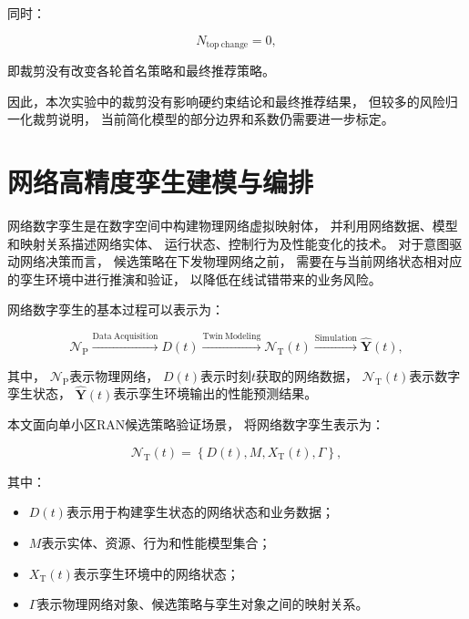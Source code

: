 \documentclass[lang=cn,12pt]{elegantbook}
\begin{document}
同时：

\begin{equation}
N_{\mathrm{top\ change}}=0,
\label{eq:clipping_top_change_reduced}
\end{equation}

即裁剪没有改变各轮首名策略和最终推荐策略。

因此，本次实验中的裁剪没有影响硬约束结论和最终推荐结果，
但较多的风险归一化裁剪说明，
当前简化模型的部分边界和系数仍需要进一步标定。

\chapter{网络高精度孪生建模与编排}
\label{sec:high_fidelity_twin_overview}

网络数字孪生是在数字空间中构建物理网络虚拟映射体，
并利用网络数据、模型和映射关系描述网络实体、
运行状态、控制行为及性能变化的技术。
对于意图驱动网络决策而言，
候选策略在下发物理网络之前，
需要在与当前网络状态相对应的孪生环境中进行推演和验证，
以降低在线试错带来的业务风险。

网络数字孪生的基本过程可以表示为：

\begin{equation}
\mathcal{N}_{\mathrm{P}}
\xrightarrow{\mathrm{Data\ Acquisition}}
D(t)
\xrightarrow{\mathrm{Twin\ Modeling}}
\mathcal{N}_{\mathrm{T}}(t)
\xrightarrow{\mathrm{Simulation}}
\hat{\boldsymbol{Y}}(t),
\label{eq:physical_to_twin_overview}
\end{equation}

其中，
$\mathcal{N}_{\mathrm{P}}$表示物理网络，
$D(t)$表示时刻$t$获取的网络数据，
$\mathcal{N}_{\mathrm{T}}(t)$表示数字孪生状态，
$\hat{\boldsymbol{Y}}(t)$表示孪生环境输出的性能预测结果。

本文面向单小区RAN候选策略验证场景，
将网络数字孪生表示为：

\begin{equation}
\mathcal{N}_{\mathrm{T}}(t)
=
\left\{
D(t),
M,
X_{\mathrm{T}}(t),
\Gamma
\right\},
\label{eq:network_twin_composition}
\end{equation}

其中：

\begin{itemize}
    \item $D(t)$表示用于构建孪生状态的网络状态和业务数据；
    \item $M$表示实体、资源、行为和性能模型集合；
    \item $X_{\mathrm{T}}(t)$表示孪生环境中的网络状态；
    \item $\Gamma$表示物理网络对象、候选策略与孪生对象之间的映射关系。
\end{itemize}
\end{document}
